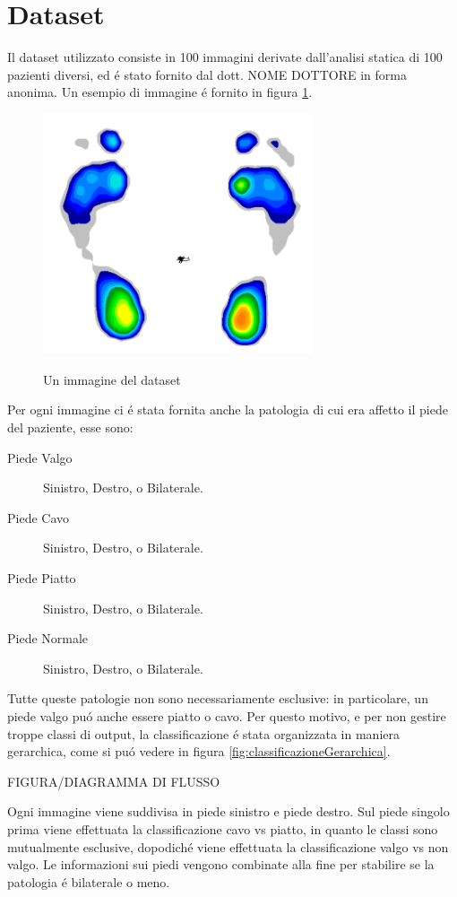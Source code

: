 \documentclass[11pt,a4paper]{article}
\begin{document}
\section{Dataset}
\label{sec:dataset}
Il dataset utilizzato consiste in 100 immagini derivate dall'analisi statica di 100 pazienti diversi, ed \'e stato fornito dal dott. NOME DOTTORE in forma anonima. Un esempio di immagine \'e fornito in figura \ref{fig:immagineEsempio}. 
\begin{figure}
\centering
\includegraphics[width=300px, keepaspectratio]{esempio.png}
\label{fig:immagineEsempio}
\caption{Un immagine del dataset}
\end{figure}
Per ogni immagine ci \'e stata fornita anche la patologia di cui era affetto il piede del paziente, esse sono:
\begin{description}
\item[Piede Valgo] Sinistro, Destro, o Bilaterale.
\item[Piede Cavo] Sinistro, Destro, o Bilaterale.
\item[Piede Piatto] Sinistro, Destro, o Bilaterale.
\item[Piede Normale] Sinistro, Destro, o Bilaterale.
\end{description}

Tutte queste patologie non sono necessariamente esclusive: in particolare, un piede valgo pu\'o anche essere piatto o cavo. Per questo motivo, e per non gestire troppe classi di output, la classificazione \'e stata organizzata in maniera gerarchica, come si pu\'o vedere in figura \ref{fig:classificazioneGerarchica}.

FIGURA/DIAGRAMMA DI FLUSSO

Ogni immagine viene suddivisa in piede sinistro e piede destro. Sul piede singolo prima viene effettuata la classificazione cavo vs piatto, in quanto le classi sono mutualmente esclusive, dopodich\'e viene effettuata la classificazione valgo vs non valgo. Le informazioni sui piedi vengono combinate alla fine per stabilire se la patologia \'e bilaterale o meno.
\end{document}
